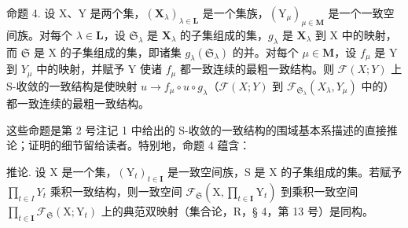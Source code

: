 命题 4. 设 X、Y 是两个集，\((\mathbf{X}_{\lambda})_{\lambda \in \mathbf{L}}\) 是一个集族，\((\mathrm{Y}_{\mu})_{\mu \in \mathbf{M}}\) 是一个一致空间族。对每个 \(\lambda \in \mathbf{L}\)，设 \(\mathfrak{S}_{\lambda}\) 是 \(\mathbf{X}_{\lambda}\) 的子集组成的集，\(g_{\lambda}\) 是 \(\mathbf{X}_{\lambda}\) 到 X 中的映射，而 \(\mathfrak{S}\) 是 X 的子集组成的集，即诸集 \(g_{\lambda}(\mathfrak{S}_{\lambda})\) 的并。对每个 \(\mu \in \mathbf{M}\)，设 \(f_{\mu}\) 是 Y 到 \(Y_{\mu}\) 中的映射，并赋予 Y 使诸 \(f_{\mu}\) 都一致连续的最粗一致结构。则 \(\mathcal{F}(X;Y)\) 上 S-收敛的一致结构是使映射 \(u \to f_{\mu} \circ u \circ g_{\lambda}\)（\(\mathcal{F}(X;Y)\) 到 \(\mathcal{F}_{\mathfrak{S}_{\lambda}}(X_{\lambda},Y_{\mu})\) 中的）都一致连续的最粗一致结构。

这些命题是第 2 号注记 1 中给出的 S-收敛的一致结构的围域基本系描述的直接推论；证明的细节留给读者。特别地，命题 4 蕴含：

推论. 设 X 是一个集，\((\mathrm{Y}_{t})_{t\in\mathbf{I}}\) 是一致空间族，S 是 X 的子集组成的集。若赋予 \(\prod_{t\in I}Y_{t}\) 乘积一致结构，则一致空间 \(\mathcal{F}_{\mathfrak{S}}\left(\mathrm{X},\prod_{t\in\mathbf{I}}\mathrm{Y}_{t}\right)\) 到乘积一致空间 \(\prod_{t\in\mathbf{I}}\mathcal{F}_{\mathfrak{S}}(\mathrm{X};\mathrm{Y}_{t})\) 上的典范双映射（集合论，R，§ 4，第 13 号）是同构。

